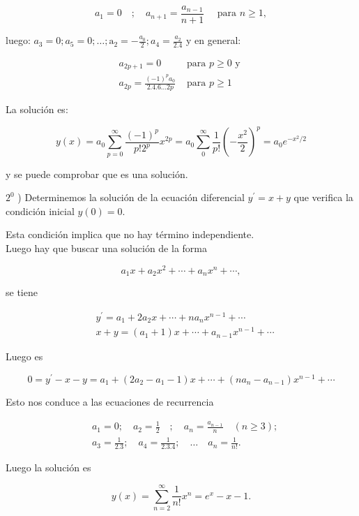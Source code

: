 \documentclass[10pt]{article}
\theoremstyle{plain}
\theoremstyle{definition}
\theoremstyle{remark}
\begin{document}
$$
a_{1}=0 \quad ; \quad a_{n+1}=\frac{a_{n-1}}{n+1} \quad \text { para } n \geqslant 1,
$$

luego: $a_{3}=0 ; a_{5}=0 ; \ldots ; \mathrm{a}_{2}=-\frac{a_{0}}{2} ; a_{4}=\frac{a_{2}}{2.4}$ y en general:

$$
\begin{array}{ll}
a_{2 p+1}=0 & \text { para } p \geqslant 0 \text { y } \\
a_{2 p}=\frac{(-1)^{p} a_{0}}{2.4 .6 \ldots 2 p} & \text { para } p \geqslant 1
\end{array}
$$

La solución es:

$$
y(x)=a_{0} \sum_{p=0}^{\infty} \frac{(-1)^{p}}{p!2^{p}} x^{2 p}=a_{0} \sum_{0}^{\infty} \frac{1}{p!}\left(-\frac{x^{2}}{2}\right)^{p}=a_{0} e^{-x^{2} / 2}
$$

y se puede comprobar que es una solución.


$2^{0}$ ) Determinemos la solución de la ecuación diferencial $y^{\prime}=x+y$ que verifica la condición inicial $y(0)=0$.

Esta condición implica que no hay término independiente.\\
Luego hay que buscar una solución de la forma

$$
a_{1} x+a_{2} x^{2}+\cdots+a_{n} x^{n}+\cdots,
$$

se tiene

$$
\begin{aligned}
& y^{\prime}=a_{1}+2 a_{2} x+\cdots+n a_{n} x^{n-1}+\cdots \\
& x+y=\left(a_{1}+1\right) x+\cdots+a_{n-1} x^{n-1}+\cdots
\end{aligned}
$$

Luego es

$$
0=y^{\prime}-x-y=a_{1}+\left(2 a_{2}-a_{1}-1\right) x+\cdots+\left(n a_{n}-a_{n-1}\right) x^{n-1}+\cdots
$$

Esto nos conduce a las ecuaciones de recurrencia

$$
\begin{aligned}
& a_{1}=0 ; \quad a_{2}=\frac{1}{2} \quad ; \quad a_{n}=\frac{a_{n-1}}{n} \quad(n \geqslant 3) ; \\
& a_{3}=\frac{1}{2.3} ; \quad a_{4}=\frac{1}{2.3 .4} ; \quad \ldots \quad a_{n}=\frac{1}{n!} .
\end{aligned}
$$

Luego la solución es

$$
y(x)=\sum_{n=2}^{\infty} \frac{1}{n!} x^{n}=e^{x}-x-1 .
$$
\end{document}
